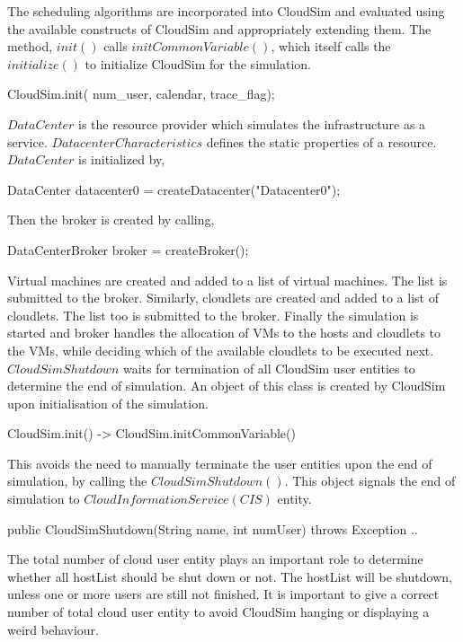 \documentclass[times, 10pt,twocolumn]{article}
\begin{document}
The scheduling algorithms are incorporated into CloudSim and evaluated using the available constructs of CloudSim and appropriately extending them. The method, $init()$ calls $initCommonVariable()$, which itself calls the $initialize()$ to initialize CloudSim for the simulation.
\begin{verbatimtab}
CloudSim.init(
    num_user, calendar, trace_flag);
\end{verbatimtab}
$DataCenter$ is the resource provider which simulates the infrastructure as a service. $DatacenterCharacteristics$ defines the static properties of a resource. $DataCenter$ is initialized by,
\begin{verbatimtab}
DataCenter datacenter0 = 
    createDatacenter("Datacenter0");
\end{verbatimtab}
Then the broker is created by calling,
\begin{verbatimtab}
DataCenterBroker broker = createBroker();
\end{verbatimtab}
Virtual machines are created and added to a list of virtual machines. The list is submitted to the broker. Similarly, cloudlets are created and added to a list of cloudlets. The list too is submitted to the broker. Finally the simulation is started and broker handles the allocation of VMs to the hosts and cloudlets to the VMs, while deciding which of the available cloudlets to be executed next. $CloudSimShutdown$ waits for termination of all CloudSim user entities to determine the end of simulation. An object of this class is created by CloudSim upon initialisation of the simulation.
\begin{verbatimtab}
CloudSim.init() -> 
    CloudSim.initCommonVariable()
\end{verbatimtab}
This avoids the need to manually terminate the user entities upon the end of simulation, by calling the $CloudSimShutdown()$. This object signals the end of simulation to $CloudInformationService (CIS)$ entity.
\begin{verbatimtab}
public CloudSimShutdown(String name,
    int numUser) throws Exception { .. }
\end{verbatimtab}
The total number of cloud user entity plays an important role to determine whether all hostList should be shut down or not. The hostList will be shutdown, unless one or more users are still not finished. It is important to give a correct number of total cloud user entity to avoid CloudSim hanging or displaying a weird behaviour. 
\end{document}
